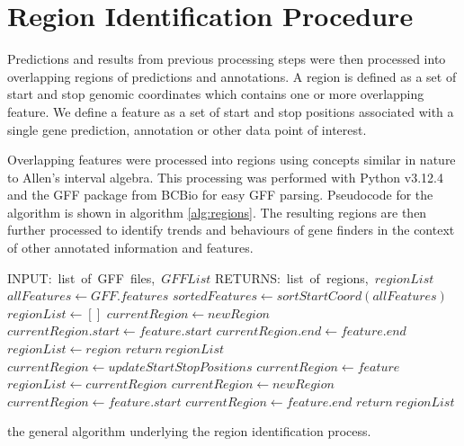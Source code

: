 \section{Region Identification Procedure}
\label{section:region-met}

Predictions and results from previous processing steps were then
processed into overlapping regions of predictions and annotations. A
region is defined as a set of start and stop genomic coordinates which
contains one or more overlapping feature. We define a feature as a set
of start and stop positions associated with a single gene prediction,
annotation or other data point of interest.

Overlapping features were processed into regions using concepts
similar in nature to Allen's interval algebra. This processing was
performed with Python v3.12.4\cite{Foundation} and the GFF package
from BCBio\cite{Chapman} for easy GFF parsing. Pseudocode for the
algorithm is shown in algorithm \ref{alg:regions}. The resulting
regions are then further processed to identify trends and behaviours
of gene finders in the context of other annotated information and
features.

\begin{algorithm}
  \begin{algorithmic}
    \State INPUT:\ list\ of\ GFF\ files,\ $GFFList$
    \State RETURNS:\ list\ of\ regions,\ $regionList$
    \State $allFeatures \gets GFF.features$
    \EndFor
    \State $sortedFeatures \gets sortStartCoord(allFeatures)$
    \State $regionList \gets []$
        \State $currentRegion \gets newRegion$
        \State $currentRegion.start \gets feature.start$
        \State $currentRegion.end \gets feature.end$
        \State $regionList \gets region$
        \State $return\ regionList$
        \State $currentRegion \gets updateStartStopPositions$
        \State $currentRegion \gets feature$
      \Else
        \State $regionList \gets currentRegion$
        \State $currentRegion \gets newRegion$
        \State $currentRegion \gets feature.start$
        \State $currentRegion \gets feature.end$
      \EndIf
    \EndFor
    \State $return\ regionList$
  \end{algorithmic}
  \caption{the general algorithm underlying the region identification
    process.}
  \label{alg:regions}
\end{algorithm}

